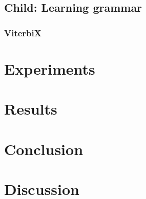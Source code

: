 \documentclass[a4paper]{article}
\begin{document}
\subsection{Child: Learning grammar} %
\subsubsection{ViterbiX} %
\section{Experiments}
\section{Results}
\section{Conclusion}
\section{Discussion}



\end{document}
